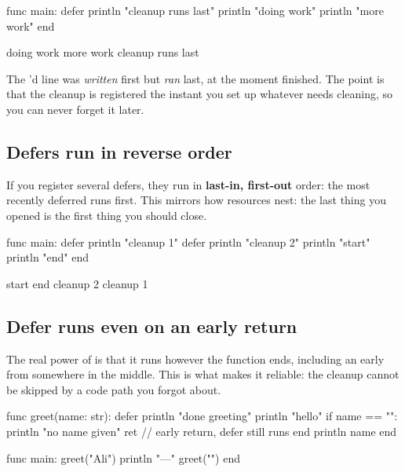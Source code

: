 \begin{salamen}
func main:
    defer println "cleanup runs last"
    println "doing work"
    println "more work"
end
\end{salamen}

\begin{progout}
doing work
more work
cleanup runs last
\end{progout}

The 'd line was \emph{written} first but \emph{ran} last, at the
moment  finished. The point is that the cleanup is registered the
instant you set up whatever needs cleaning, so you can never forget it later.

\subsection{Defers run in reverse order}

If you register several defers, they run in \textbf{last-in, first-out} order:
the most recently deferred runs first. This mirrors how resources nest: the last
thing you opened is the first thing you should close.

\begin{salamen}
func main:
    defer println "cleanup 1"
    defer println "cleanup 2"
    println "start"
    println "end"
end
\end{salamen}

\begin{progout}
start
end
cleanup 2
cleanup 1
\end{progout}

\subsection{Defer runs even on an early return}

The real power of  is that it runs however the function ends,
including an early  from somewhere in the middle. This is what makes it
reliable: the cleanup cannot be skipped by a code path you forgot about.

\begin{salamen}
func greet(name: str):
    defer println "done greeting"
    println "hello"
    if name == "":
        println "no name given"
        ret                        // early return, defer still runs
    end
    println name
end

func main:
    greet("Ali")
    println "---"
    greet("")
end
\end{salamen}

